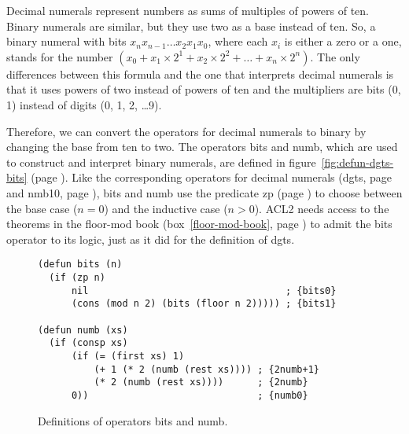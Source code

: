 Decimal numerals represent numbers as sums of multiples of powers of ten.
Binary numerals are similar, but they use two as a base instead of ten.
So, a binary numeral with bits $x_nx_{n-1}\dots x_2x_1x_0$,
where each $x_i$ is either a zero or a one, stands for the number
$(x_0 + x_1 \times 2^1 + x_2 \times 2^2 + \dots + x_{n} \times 2^{n})$.
The only differences between this formula and the one that interprets
decimal numerals is that it uses powers of two instead of 
powers of ten and the multipliers are bits (0, 1) instead of
digits (0, 1, 2, \dots 9).

Therefore, we can convert the operators for decimal numerals to binary
by changing the base from ten to two.
The operators \textsf{bits} and \textsf{numb},
which are used to construct and interpret binary numerals,
are defined in
figure~\ref{fig:defun-dgts-bits} (page \pageref{fig:defun-dgts-bits}).
Like the corresponding operators for decimal numerals
(\textsf{dgts}, page \pageref{dgts-defun} and \textsf{nmb10}, page \pageref{nmb10-defun}),
\textsf{bits} and \textsf{numb} use the predicate \textsf{zp} (page \pageref{zp-def}) to choose
between the base case ($n = 0$) and the inductive case ($n > 0$).
ACL2 needs access to the theorems
in the floor-mod book (box~\ref{floor-mod-book}, page \pageref{floor-mod-book})
to admit the \textsf{bits} operator to its logic,
just as it did for the definition of \textsf{dgts}.

\begin{figure}
\begin{code}
\begin{verbatim}
(defun bits (n)
  (if (zp n)
      nil                                   ; {bits0}
      (cons (mod n 2) (bits (floor n 2))))) ; {bits1}

(defun numb (xs)
  (if (consp xs)
      (if (= (first xs) 1)
          (+ 1 (* 2 (numb (rest xs)))) ; {2numb+1}
          (* 2 (numb (rest xs))))      ; {2numb}
      0))                              ; {numb0}
\end{verbatim}
\end{code}
\caption{Definitions of operators \textsf{bits} and \textsf{numb}.}
\label{fig:defun-dgts-bits}
\label{nmb-defun}
\label{bits-defun}
\end{figure}
	
